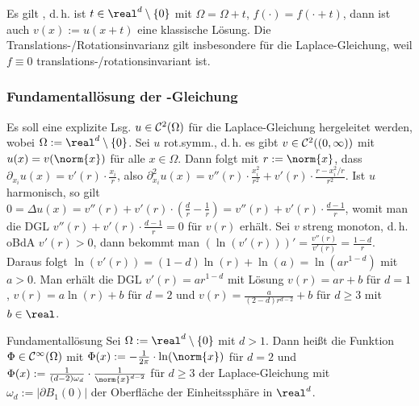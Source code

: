 \begin{Bem}
    Es gilt , d.\,h. ist
    $t \in \real^d \setminus \{0\}$ mit $\Omega = \Omega + t$, $f(\cdot) = f(\cdot + t)$,
    dann ist auch $v(x) := u(x + t)$ eine klassische Lösung.
    Die Translations-/Rotationsinvarianz gilt insbesondere für die Laplace-Gleichung,
    weil $f \equiv 0$ translations-/rotationsinvariant ist.
\end{Bem}

\subsubsection{%
    Fundamentallösung der -Gleichung%
}

\begin{Bem}
    Es soll eine explizite Lsg. $u \in \mathcal{C}^2(\Omega)$
    für die Laplace-Gleichung hergeleitet werden, wobei $\Omega := \real^d \setminus \{0\}$.
    Sei $u$ rot.symm., d.\,h. es gibt $v \in \mathcal{C}^2((0, \infty))$ mit
    $u(x) = v(\norm{x})$ für alle $x \in \Omega$.
    Dann folgt mit $r := \norm{x}$, dass
    $\partial_{x_i} u(x) = v'(r) \cdot \frac{x_i}{r}$,
    also $\partial_{x_i}^2 u(x) =
    v''(r) \cdot \frac{x_i^2}{r^2} + v'(r) \cdot \frac{r - x_i^2/r}{r^2}$.
    Ist $u$ harmonisch, so gilt
    $0 = \Delta u(x) =
    v''(r) + v'(r) \cdot \left(\frac{d}{r} - \frac{1}{r}\right)
    = v''(r) + v'(r) \cdot \frac{d-1}{r}$,
    womit man die DGL $v''(r) + v'(r) \cdot \frac{d-1}{r} = 0$ für $v(r)$ erhält.
    Sei $v$ streng monoton, d.\,h. oBdA $v'(r) > 0$, dann bekommt man
    $(\ln(v'(r)))' = \frac{v''(r)}{v'(r)} = \frac{1-d}{r}$.
    Daraus folgt $\ln(v'(r)) = (1 - d)\ln(r) + \ln(a) = \ln(ar^{1-d})$
    mit $a > 0$.
    Man erhält die DGL $v'(r) = ar^{1-d}$ mit Lösung
    $v(r) = ar + b$ für $d = 1$,
    $v(r) = a\ln(r) + b$ für $d = 2$ und
    $v(r) = \frac{a}{(2-d) r^{d-2}} + b$ für $d \ge 3$ mit $b \in \real$.
\end{Bem}

\linie

\begin{Def}{Fundamentallösung}
    Sei $\Omega := \real^d \setminus \{0\}$ mit $d > 1$.
    Dann heißt die Funktion $\Phi \in \mathcal{C}^\infty(\Omega)$ mit
    $\Phi(x) := -\frac{1}{2\pi} \cdot \ln(\norm{x})$ für $d = 2$ und
    $\Phi(x) := \frac{1}{(d-2)\omega_d} \cdot \frac{1}{\norm{x}^{d-2}}$ für $d \ge 3$
     der Laplace-Gleichung
    mit $\omega_d := |\partial B_1(0)|$ der Oberfläche der Einheitssphäre in $\real^d$.
\end{Def}

